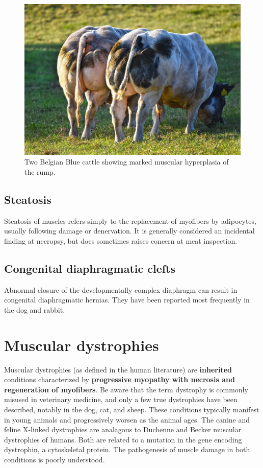 \documentclass[openany]{book}
\begin{document}
\begin{figure}

{\centering \includegraphics[width=0.6\linewidth]{images/belgian-blue} 

}

\caption{Two Belgian Blue cattle showing marked muscular hyperplasia of the rump.}\label{fig:belgian-blue}
\end{figure}

\subsection{Steatosis}\label{steatosis}

Steatosis of muscles refers simply to the replacement of myofibers by
adipocytes, usually following damage or denervation. It is generally
considered an incidental finding at necropsy, but does sometimes raises
concern at meat inspection.

\subsection{Congenital diaphragmatic
clefts}\label{congenital-diaphragmatic-clefts}

Abnormal closure of the developmentally complex diaphragm can result in
congenital diaphragmatic hernias. They have been reported most
frequently in the dog and rabbit.

\section{Muscular dystrophies}\label{muscular-dystrophies}

Muscular dystrophies (as defined in the human literature) are
\textbf{inherited} conditions characterized by \textbf{progressive
myopathy with necrosis and regeneration of myofibers}. Be aware that the
term dystrophy is commonly misused in veterinary medicine, and only a
few true dystrophies have been described, notably in the dog, cat, and
sheep. These conditions typically manifest in young animals and
progressively worsen as the animal ages. The canine and feline X-linked
dystrophies are analagous to Duchenne and Becker muscular dystrophies of
humans. Both are related to a mutation in the gene encoding dystrophin,
a cytoskeletal protein. The pathogenesis of muscle damage in both
conditions is poorly understood.
\end{document}
